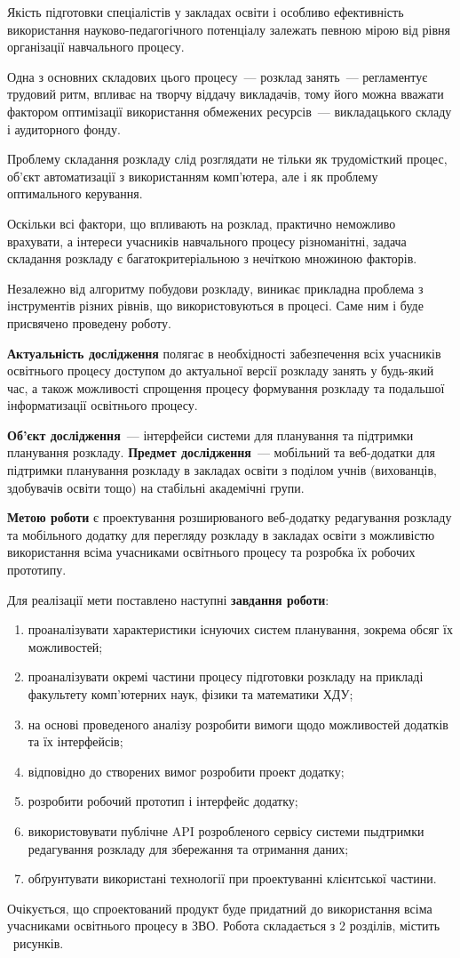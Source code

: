 
Якість підготовки спеціалістів у закладах освіти і особливо ефективність використання науково-педагогічного потенціалу залежать певною мірою від рівня організації навчального процесу.

Одна з основних складових цього процесу~--- розклад занять~--- регламентує трудовий ритм, впливає на творчу віддачу викладачів, тому його можна вважати фактором оптимізації використання обмежених ресурсів~--- викладацького складу і аудиторного фонду.

Проблему складання розкладу слід розглядати не тільки як трудомісткий процес, об'єкт автоматизації з використанням комп’ютера, але і як проблему оптимального керування. 

Оскільки всі фактори, що впливають на розклад, практично неможливо врахувати, а інтереси учасників навчального процесу різноманітні, задача складання розкладу є багатокритеріальною з нечіткою множиною факторів.

Незалежно від алгоритму побудови розкладу, виникає прикладна проблема з інструментів різних рівнів, що використовуються в процесі. Саме ним і буде присвячено проведену роботу.

\textbf{Актуальність дослідження} полягає в необхідності забезпечення всіх учасників освітнього процесу доступом до актуальної версії розкладу занять у будь-який час, а також можливості спрощення процесу формування розкладу та подальшої інформатизації освітнього процесу.

\textbf{Об'єкт дослідження}~--- інтерфейси системи для планування та підтримки планування розкладу. \textbf{Предмет дослідження}~--- мобільний та веб-додатки для підтримки планування розкладу в закладах освіти з поділом учнів (вихованців, здобувачів освіти тощо) на стабільні академічні групи.

\textbf{Метою роботи} є проектування розширюваного веб-додатку редагування розкладу та мобільного додатку для перегляду розкладу в закладах освіти з можливістю використання всіма учасниками освітнього процесу та розробка їх робочих прототипу.

Для реалізації мети поставлено наступні \textbf{завдання роботи}:
\begin{enumerate}
	\item проаналізувати характеристики існуючих систем планування, зокрема обсяг їх можливостей;
	\item проаналізувати окремі частини процесу підготовки розкладу на прикладі факультету комп’ютерних наук, фізики та математики ХДУ;
	\item на основі проведеного аналізу розробити вимоги щодо можливостей додатків та їх інтерфейсів;
	\item відповідно до створених вимог розробити проект додатку;
	\item розробити робочий прототип і інтерфейс додатку;
	\item використовувати публічне API розробленого сервісу системи пыдтримки редагування розкладу для збережання та отримання даних;
	\item обґрунтувати використані технології при проектуванні клієнтської частини.
\end{enumerate}

Очікується, що спроектований продукт буде придатний до використання всіма учасниками освітнього процесу в ЗВО.
Робота складається з 2 розділів, містить \totalfigures\ рисунків.
